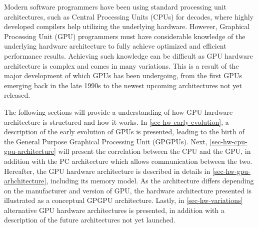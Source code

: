 Modern software programmers have been using standard processing unit architectures, such as Central Processing Units (CPUs) for decades, where highly developed compilers help utilizing the underlying hardware.
However, Graphical Processing Unit (GPU) programmers must have considerable knowledge of the underlying hardware architecture to fully achieve optimized and efficient performance results.
Achieving such knowledge can be difficult as GPU hardware architecture is complex and comes in many variations.
This is a result of the major development of which GPUs has been undergoing, from the first GPUs emerging back in the late 1990s to the newest upcoming architectures not yet released.

The following sections will provide a understanding of how GPU hardware architecture is structured and how it works.
In \cref{sec-hw-early-evolution}, a description of the early evolution of GPUs is presented, leading to the birth of the General Purpose Graphical Processing Unit (GPGPUs).
Next, \cref{sec-hw-cpu-gpu-architecture} will present the correlation between the CPU and the GPU, in addition with the PC architecture which allows communication between the two.
Hereafter, the GPU hardware architecture is described in details in \cref{sec-hw-gpu-arhchitecture}, including its memory model.
As the architecture differs depending on the manufacturer and version of GPU, the hardware architecture presented is illustrated as a conceptual GPGPU architecture.
Lastly, in \cref{sec-hw-variations} alternative GPU hardware architectures is presented, in addition with a description of the future architectures not yet launched.

 